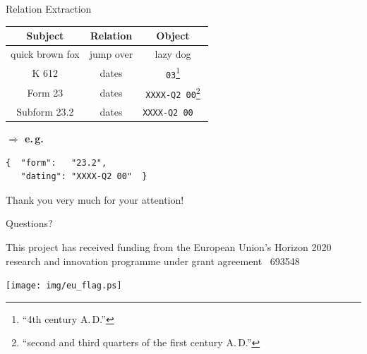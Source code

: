 \documentclass[xcolor=x11names, aspectratio=169,usenames,dvipsnames]{beamer}
\begin{document}
\begin{frame}[fragile]{Relation Extraction}
\begin{center}
\begin{tabularx}{\textwidth}{CCC}
\toprule
\textbf{Subject}&\textbf{Relation}&\textbf{Object}\\\midrule
quick brown fox&jump over&lazy dog\\
K 612&dates&\texttt{03}\footnote{\enquote{4th century A.\,D.}}\\
Form 23&dates&\texttt{XXXX-Q2 00}\footnote{\enquote{second and third quarters of the first century A.\,D.}}\\
Subform 23.2&dates&\texttt{XXXX-Q2 00}~~\\
\bottomrule
\end{tabularx}\bigskip\pause

\begin{minipage}{0.3\textwidth}\flushright
\textbf{$\boldsymbol{\Rightarrow}$ e.\,g.}
\end{minipage}\hfill
\begin{minipage}{0.65\textwidth}
{
\begin{verbatim}
{  "form":   "23.2",
   "dating": "XXXX-Q2 00"  }
\end{verbatim}
}
\end{minipage}
\end{center}
\end{frame}

\begin{frame}[plain]
\vfill\vfill\vfill
\begin{center}\Large
Thank you very much for your attention!\\\bigskip

Questions?
\end{center}\vfill\vfill

\hfill
\begin{minipage}{0.7\textwidth}\scriptsize
\begin{flushright}
This project has received funding from the European Union's Horizon 2020 research and innovation programme under grant agreement \textnumero\ 693548
\end{flushright}
\end{minipage}\hspace*{1em}
\begin{minipage}{0.1\textwidth}
\texttt{[image: img/eu\_flag.ps]}
\end{minipage}
\end{frame}

\maketitle
\end{document}
